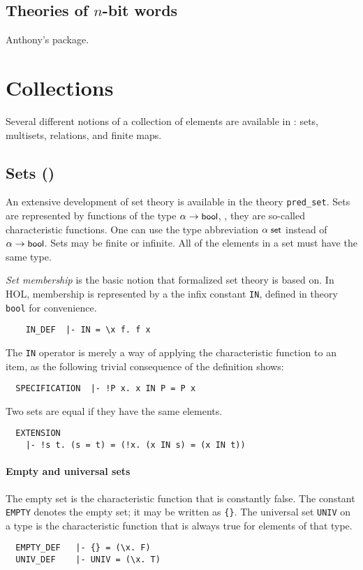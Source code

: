 \subsection{Theories of $n$-bit words}

Anthony's package.

\section{Collections}

Several different notions of a collection of elements are available in
\HOL: sets, multisets, relations, and finite maps.

\subsection{Sets ()}

An extensive development of set theory is available in the theory
{\small\verb+pred_set+}. Sets are represented by functions of the type
$\alpha \to \mbox{\small{\textbf{\sf{bool}}}}$, \ie, they are so-called characteristic
functions. One can use the type abbreviation $\alpha\; \mbox{\small{\textbf{\sf{set}}}}$
instead of $\alpha \to \mbox{\small{\textbf{\sf{bool}}}}$. Sets may be finite or
infinite. All of the elements in a set must have the same type.

\emph{Set membership} is the basic notion that formalized set theory
is based on. In HOL, membership is represented by a the infix constant
{\small\verb+IN+}, defined in theory {\small\verb+bool+} for
convenience.
%
{\small
\begin{verbatim}
    IN_DEF  |- IN = \x f. f x
\end{verbatim}}
%
The {\small\verb+IN+} operator is merely a way of applying the
characteristic function to an item, as the following
trivial consequence of the definition shows:
%
{\small
\begin{verbatim}
  SPECIFICATION  |- !P x. x IN P = P x
\end{verbatim}}
%
\noindent Two sets are equal if they have the same elements.
%
{\small
\begin{verbatim}
  EXTENSION
    |- !s t. (s = t) = (!x. (x IN s) = (x IN t))
\end{verbatim}}

\paragraph{Empty and universal sets}

The empty set is the characteristic function that is constantly
false. The constant {\small\verb+EMPTY+} denotes the empty set; it may
be written as {\small\verb+{}+}. The universal set {\small\verb+UNIV+}
on a type is the characteristic function that is always true for
elements of that type.
%
{\small
\begin{verbatim}
  EMPTY_DEF   |- {} = (\x. F)
  UNIV_DEF    |- UNIV = (\x. T)
\end{verbatim}}
%
